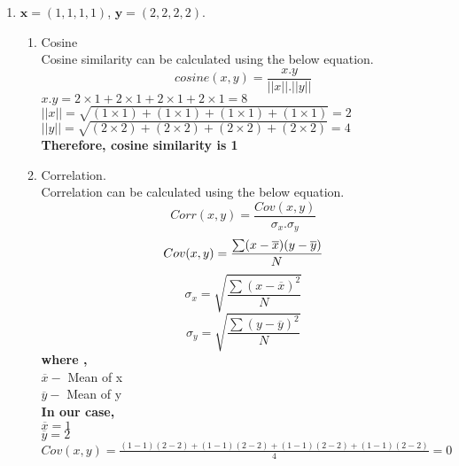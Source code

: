 \documentclass{article}
\begin{document}
\begin{enumerate}
    \item $\textbf{x} = (1,1,1,1)$, $\textbf{y} = (2,2,2,2)$.\\
    \begin{enumerate}
        \item Cosine\\
        Cosine similarity can be calculated using the below equation.
        \begin{equation} \label{cosine}
            cosine(x,y) =  \frac{x.y}{||x||.||y||}
        \end{equation}
        $x.y = 2 \times 1 + 2 \times 1 + 2 \times 1 + 2 \times 1 = 8$\\
        $||x|| = \sqrt{(1\times1)+(1\times1)+(1\times1)+(1\times1)} = 2$\\
        $||y|| = \sqrt{(2\times2)+(2\times2)+(2\times2)+(2\times2)} = 4$\\
        \textbf{Therefore, cosine similarity is 1}
        \item Correlation.\\
        Correlation can be calculated using the below equation.
        \begin{equation} \label{correlation}
            Corr(x,y) =  \frac{Cov(x,y)}{\sigma_x . \sigma_y}
        \end{equation}
        \begin{equation} \label{covariance}
            Cov(x,y) = \frac{\sum (x-\overline{x})(y-\overline{y})}{N}\\
        \end{equation}
        \begin{equation} \label{standardDeviationX}
            \sigma_x = \sqrt{\frac{\sum (x-\overline{x})^2}{N}}
        \end{equation}
        \begin{equation} \label{standardDeviationY}
            \sigma_y = \sqrt{\frac{\sum (y-\overline{y})^2}{N}}
        \end{equation}
        \textbf{where ,}\\
        $\overline{x}-$ Mean of x\\
        $\overline{y}-$ Mean of y\\
        \textbf{In our case,}\\
        $\overline{x} = 1$ \\
        $\overline{y} = 2$\\
        $Cov(x,y) = \frac{(1-1)(2-2)+(1-1)(2-2)+(1-1)(2-2)+(1-1)(2-2)}{4} = 0$\\

\end{enumerate}
\end{enumerate}
\end{document}
